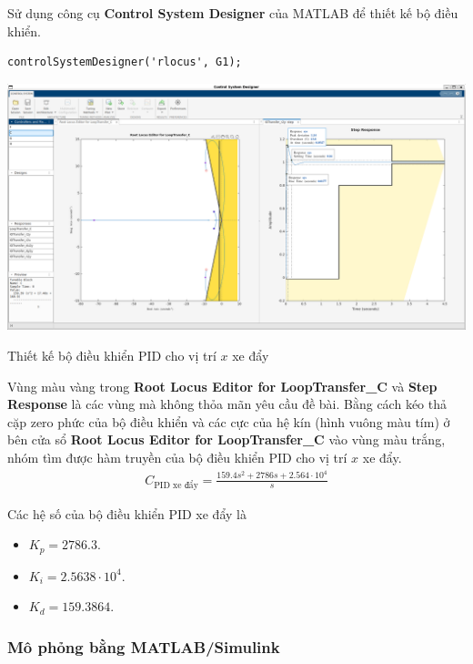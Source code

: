 \documentclass[12pt,a4paper]{article}
\begin{document}
Sử dụng công cụ \textbf{Control System Designer} của MATLAB để thiết kế bộ điều khiển. 
\begin{lstlisting}[style=matlabstyle,caption=Thiết kế bộ điều khiển PID cho hàm truyền $G_2(s)$]
controlSystemDesigner('rlocus', G1);
\end{lstlisting}


\begin{center}
    \captionsetup{type=figure}
    \includegraphics[width=\linewidth]{thiet_ke_PID_xe_day.png}
    \caption{Thiết kế bộ điều khiển PID cho vị trí $x$ xe đẩy}
\end{center}

Vùng màu vàng trong \textbf{Root Locus Editor for LoopTransfer\_C} và  \textbf{Step Response} là các vùng mà không thỏa mãn yêu cầu đề bài. Bằng cách kéo thả cặp zero phức của bộ điều khiển và các cực của hệ kín (hình vuông màu tím) ở bên cửa sổ \textbf{Root Locus Editor for LoopTransfer\_C} vào vùng màu trắng, nhóm tìm được hàm truyền của bộ điều khiển PID cho vị trí $x$ xe đẩy.
\begin{align}
    C_{\text{PID xe đẩy}} = \frac{159.4 s^2 + 2786 s + 2.564\cdot 10^4}{s}
\end{align}

Các hệ số của bộ điều khiển PID xe đẩy là
\begin{itemize}
    \item $K_p = 2786.3$.
    \item $K_i = 2.5638\cdot 10^4$.
    \item $K_d = 159.3864 $.
\end{itemize}

\subsubsection{Mô phỏng bằng MATLAB/Simulink}
\end{document}
